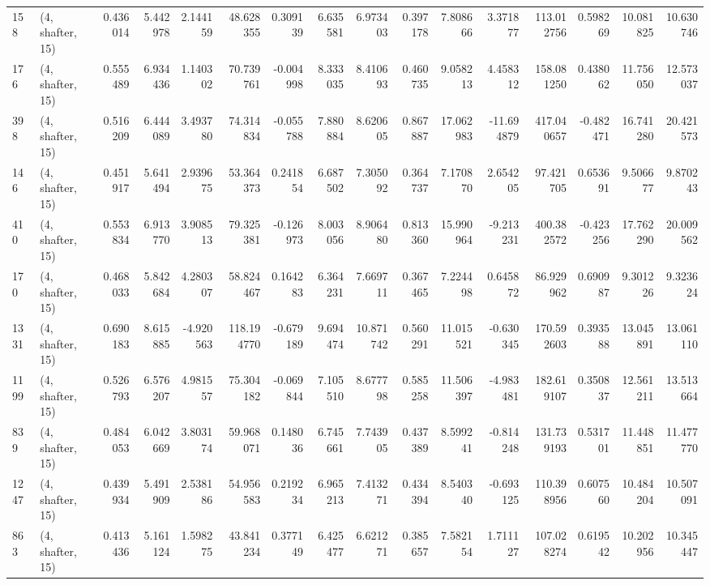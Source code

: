 \begin{tabular}{llrrrrrrrrrrrrrr}
158  &  (4, shafter, 15) &   0.436014 &   5.442978 &   2.144159 &     48.628355 &    0.309139 &    6.635581 &    6.973403 &  0.397178 &   7.808666 &   3.371877 &   113.012756 &   0.598269 &  10.081825 &  10.630746 \\
176  &  (4, shafter, 15) &   0.555489 &   6.934436 &   1.140302 &     70.739761 &   -0.004998 &    8.333035 &    8.410693 &  0.460735 &   9.058213 &   4.458312 &   158.081250 &   0.438062 &  11.756050 &  12.573037 \\
398  &  (4, shafter, 15) &   0.516209 &   6.444089 &   3.493780 &     74.314834 &   -0.055788 &    7.880884 &    8.620605 &  0.867887 &  17.062983 & -11.694879 &   417.040657 &  -0.482471 &  16.741280 &  20.421573 \\
146  &  (4, shafter, 15) &   0.451917 &   5.641494 &   2.939675 &     53.364373 &    0.241854 &    6.687502 &    7.305092 &  0.364737 &   7.170870 &   2.654205 &    97.421705 &   0.653691 &   9.506677 &   9.870243 \\
410  &  (4, shafter, 15) &   0.553834 &   6.913770 &   3.908513 &     79.325381 &   -0.126973 &    8.003056 &    8.906480 &  0.813360 &  15.990964 &  -9.213231 &   400.382572 &  -0.423256 &  17.762290 &  20.009562 \\
170  &  (4, shafter, 15) &   0.468033 &   5.842684 &   4.280307 &     58.824467 &    0.164283 &    6.364231 &    7.669711 &  0.367465 &   7.224498 &   0.645872 &    86.929962 &   0.690987 &   9.301226 &   9.323624 \\
1331 &  (4, shafter, 15) &   0.690183 &   8.615885 &  -4.920563 &    118.194770 &   -0.679189 &    9.694474 &   10.871742 &  0.560291 &  11.015521 &  -0.630345 &   170.592603 &   0.393588 &  13.045891 &  13.061110 \\
1199 &  (4, shafter, 15) &   0.526793 &   6.576207 &   4.981557 &     75.304182 &   -0.069844 &    7.105510 &    8.677798 &  0.585258 &  11.506397 &  -4.983481 &   182.619107 &   0.350837 &  12.561211 &  13.513664 \\
839  &  (4, shafter, 15) &   0.484053 &   6.042669 &   3.803174 &     59.968071 &    0.148036 &    6.745661 &    7.743905 &  0.437389 &   8.599241 &  -0.814248 &   131.739193 &   0.531701 &  11.448851 &  11.477770 \\
1247 &  (4, shafter, 15) &   0.439934 &   5.491909 &   2.538186 &     54.956583 &    0.219234 &    6.965213 &    7.413271 &  0.434394 &   8.540340 &  -0.693125 &   110.398956 &   0.607560 &  10.484204 &  10.507091 \\
863  &  (4, shafter, 15) &   0.413436 &   5.161124 &   1.598275 &     43.841234 &    0.377149 &    6.425477 &    6.621271 &  0.385657 &   7.582154 &   1.711127 &   107.028274 &   0.619542 &  10.202956 &  10.345447 \\

\end{tabular}

